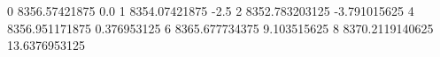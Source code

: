 0 8356.57421875 0.0
1 8354.07421875 -2.5
2 8352.783203125 -3.791015625
4 8356.951171875 0.376953125
6 8365.677734375 9.103515625
8 8370.2119140625 13.6376953125
